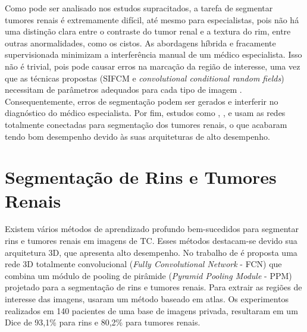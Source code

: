 Como pode ser analisado nos estudos supracitados, a tarefa de segmentar tumores renais é extremamente difícil, até mesmo para especialistas, pois não há uma distinção clara entre o contraste do tumor renal e a textura do rim, entre outras anormalidades, como os cistos. As abordagens híbrida e fracamente supervisionada \cite{kaur2019hybrid,yang2020weakly} minimizam a interferência manual de um médico especialista. Isso não é trivial, pois pode causar erros na marcação da região de interesse, uma vez que as técnicas propostas (SIFCM e \textit{convolutional conditional random fields}) necessitam de parâmetros adequados para cada tipo de imagem \cite{RUAN2020101721}. Consequentemente, erros de segmentação podem ser gerados e interferir no diagnóstico do médico especialista. Por fim, estudos como , ,  e  usam as redes totalmente conectadas para segmentação dos tumores renais, o que acabaram tendo bom desempenho devido às suas arquiteturas de alto desempenho.


\section{Segmentação de Rins e Tumores Renais}
\label{sec:trabalhos-relacionados-rins-e-tumores-renais}

Existem vários métodos de aprendizado profundo bem-sucedidos para segmentar rins e tumores renais em imagens de TC. Esses métodos destacam-se devido sua arquitetura 3D, que apresenta alto desempenho. No trabalho de  é proposta uma rede 3D totalmente convolucional (\textit{Fully Convolutional Network} - FCN) que combina um módulo de pooling de pirâmide (\textit{Pyramid Pooling Module} - PPM) projetado para a segmentação de rins e tumores renais. Para extrair as regiões de interesse das imagens, usaram um método baseado em atlas. Os experimentos realizados em 140 pacientes de uma base de imagens privada, resultaram em um Dice de 93,1\% para rins e 80,2\% para tumores renais.

